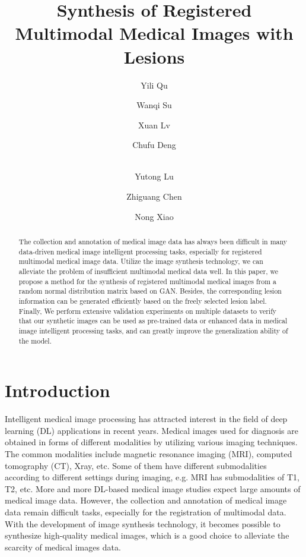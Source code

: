 \documentclass[runningheads]{llncs}
\begin{document}
	\title{Synthesis of Registered Multimodal
		Medical Images with Lesions}
	\author{ Yili Qu \and Wanqi Su \and Xuan Lv \and Chufu Deng 
		\and \\Yutong Lu \and Zhiguang Chen \and Nong Xiao}
	
	
	\maketitle       %
	\begin{abstract}
		The collection and annotation of medical image data has always been difficult in many data-driven medical image intelligent processing tasks, especially for registered multimodal medical image data. Utilize the image synthesis technology, we can alleviate the problem of insufficient multimodal medical data well. In this paper, we propose a method for the synthesis of registered multimodal medical images from a random normal distribution matrix based on GAN. Besides, the corresponding lesion information can be generated efficiently based on the freely selected lesion label. Finally, We perform extensive validation experiments on multiple datasets to verify that our synthetic images can be used as pre-trained data or enhanced data in medical image intelligent processing tasks, and can greatly improve the generalization ability of the model.
		
	\end{abstract}
	\section{Introduction}
	Intelligent medical image processing has attracted interest in the field of deep learning (DL) applications in recent years. Medical images used for diagnosis are obtained in forms of different modalities by utilizing various imaging techniques. The common modalities include magnetic resonance imaging (MRI), computed tomography (CT), Xray, etc. Some of them have different submodalities according to different settings during imaging, e.g. MRI has submodalities of T1, T2, etc. More and more DL-based medical image studies expect large amounts of medical image data. However, the collection and annotation of medical image data remain difficult tasks, especially for the registration of multimodal data. With the development of image synthesis technology, it becomes possible to synthesize high-quality medical images, which is a good choice to alleviate the scarcity of medical images data.
	
\end{document}
